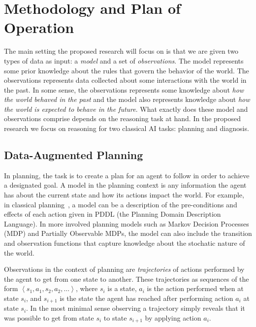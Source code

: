 \documentclass[12pt]{article}
\newcommand{\tuple}[1]{\ensuremath{\left \langle #1 \right \rangle }}
\begin{document}
\section{Methodology and Plan of Operation}
\label{sec:methodology}


The main setting the proposed research will focus on is that we are given two types of data as input: 
a {\em model} and a set of {\em observations}. The model represents some prior knowledge about the rules that govern the behavior of the world. The observations represents data collected about some  interactions with the world in the past. In some sense, the observations represents some knowledge about {\em how the world behaved in the past} and the model also represents knowledge about {\em how the world is expected to behave in the future}. What exactly does these model and observations comprise depends on the reasoning task at hand. In the proposed research we focus on reasoning for two classical AI tasks: planning and diagnosis. 



\subsection{Data-Augmented Planning}

In planning, the task is to create a plan for an agent to follow in order to achieve a designated goal. A model in the planning context is any information the agent has about the current state and how its actions impact the world. For example, in classical planning~\cite{fikes1971strips}, a model can be a description of the pre-conditions and effects of each action given in PDDL (the Planning Domain Description Language). In more involved planning models such as Markov Decision Processes (MDP) and Partially Observable MDPs, the model can also include the transition and observation functions that capture knowledge about the stochatic nature of the world. 


Observations in the context of planning are {\em trajectories} of actions performed by the agent to get from one state to another. These trajectories as sequences of the form $\tuple{ s_1, a_1, s_2, a_2, \ldots}$, where $s_i$ is a state, $a_i$ is the action performed when at state $s_i$, and $s_{i+1}$ is the state the agent has reached after performing action $a_i$ at state $s_i$. In the most minimal sense observing a trajectory simply reveals that it was possible to get from state $s_i$ to state $s_{i+1}$ by applying action $a_i$. %
\end{document}
